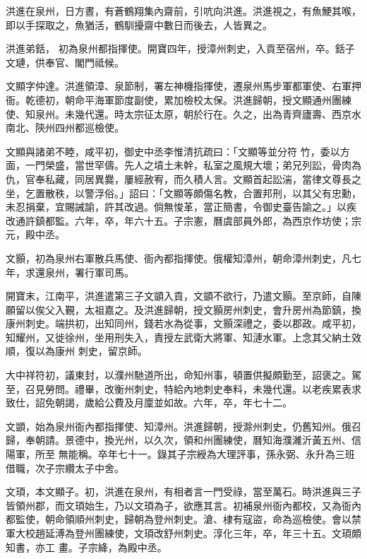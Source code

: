 \begin{pinyinscope}
 洪進在泉州，日方晝，有蒼鶴翔集內齋前，引吭向洪進。洪進視之，有魚鯁其喉，即以手探取之，魚猶活，鶴馴擾齋中數日而後去，人皆異之。



 洪進弟銛，
 初為泉州都指揮使。開寶四年，授漳州刺史，入貢至宿州，卒。銛子文璉，供奉官、閣門祗候。



 文顯字仲達。洪進領漳、泉節制，署左神機指揮使，遷泉州馬步軍都軍使、右軍押衙。乾德初，朝命平海軍節度副使，累加檢校太保。洪進歸朝，授文顯通州團練使、知泉州。未幾代還。時太宗征太原，朝於行在。久之，出為青齊廬壽、西京水南北、陝州四州都巡檢使。



 文顯與諸弟不睦，咸平初，御史中丞李惟清抗疏曰：「文顯等並分符
 竹，委以方面，一門榮盛，當世罕儔。先人之墳土未幹，私室之風規大壞；弟兄列訟，骨肉為仇，官奉私藏，同居異爨，屢經赦宥，而久積人言。文顯首起訟湍，當律文尊長之坐，乞置散秩，以警浮俗。」詔曰：「文顯等頗傷名教，合置邦刑，以其父有忠勳，未忍捐棄，宜賜誡諭，許其改過。倘無悛革，當正簡書，令御史臺告諭之。」以疾改通許鎮都監。六年，卒，年六十五。子宗憲，曆虞部員外郎，為西京作坊使；宗元，殿中丞。



 文顥，初為泉州右軍散兵馬使、衙內都指揮使。俄權知漳州，朝命漳州刺史，凡七年，求還泉州，署行軍司馬。



 開寶末，江南平，洪進遣第三子文顗入貢，文顗不欲行，乃遣文顥。至京師，自陳願留以俟父入覲，太祖嘉之。及洪進歸朝，授文顥房州刺史，會升房州為節鎮，換康州刺史。端拱初，出知同州，錢若水為從事，文顥深禮之，委以郡政。咸平初，知耀州，又徙徐州，坐用刑失入，責授左武衛大將軍、知漣水軍。上念其父納土效順，復以為康州
 刺史，留京師。



 大中祥符初，議東封，以濮州馳道所出，命知州事，頓置供擬頗勤至，詔褒之。駕至，召見勞問。禮畢，改衡州刺史，特給內地刺史奉料，未幾代還。以老疾累表求致仕，詔免朝謁，歲給公費及月廩並如故。六年，卒，年七十二。



 文顗，始為泉州衙內都指揮使、知漳州。洪進歸朝，授滁州刺史，仍舊知州。俄召歸，奉朝請。景德中，換光州，以久次，領和州團練使，曆知海濮濰沂黃五州、信陽軍，所至
 無能稱。卒年七十一。錄其子宗綬為大理評事，孫永弼、永升為三班借職，次子宗纘太子中舍。



 文頊，本文顯子。初，洪進在泉州，有相者言一門受祿，當至萬石。時洪進與三子皆領州郡，而文頊始生，乃以文頊為子，欲應其言。初補泉州衙內都校，又為衙內都監使，朝命領順州刺史，歸朝為登州刺史。滄、棣有寇盜，命為巡檢使。會以禁軍大校趙延溥為登州團練使，文頊改舒州刺史。淳化三年，卒，年三十五。文頊頗知書，亦工
 畫。子宗絳，為殿中丞。



\end{pinyinscope}